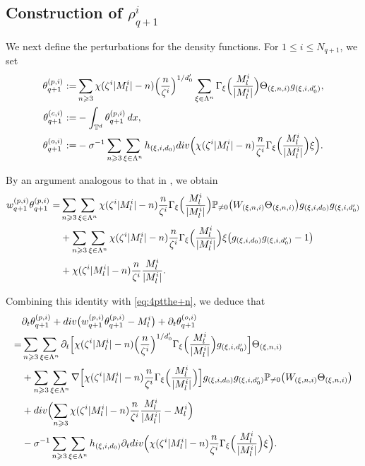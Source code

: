 \documentclass[10pt,a4paper]{amsart}
\numberwithin{equation}{section}
\def\dif{{\mathord{{\rm d}}}}
\def\geq{\geqslant}
\def\leq{\leqslant}
\def\div{\mathord{{\rm div}}}
\def\dif{{\mathord{{\rm d}}}}
\def\geq{\geqslant}
\def\leq{\leqslant}
\def\div{\mathord{{\rm div}}}
\begin{document}
\subsection{Construction of $\rho^{i}_{q+1}$}\label{sec:con:the}
We next define the perturbations for the density functions. 
For $1\leq i\leq N_{q+1}$, we set
\begin{align}
\theta_{q+1}^{(p,i)}
:=
&\sum_{n\geq3}
\chi(\zeta^i|M_l^i|-n)
\Bigl(\frac{n}{\zeta^i}\Bigr)^{1/d_0'}
\sum_{\xi\in\Lambda^n}
\Gamma_\xi\Bigl(\frac{M_l^i}{|M_l^i|}\Bigr)
\Theta_{(\xi,n,i)}
g_{(\xi,i,d_0')},
\notag\\
\theta_{q+1}^{(c,i)}
:=
&-
\int_{\mathbb{T}^d}
\theta_{q+1}^{(p,i)}\,\dif x,
\notag\\
\theta_{q+1}^{(o,i)}
:=
&-
\sigma^{-1}
\sum_{n\geq3}
\sum_{\xi\in\Lambda^n}
h_{(\xi,i,d_0)}
\div\Bigl(
\chi(\zeta^i|M_l^i|-n)
\frac{n}{\zeta^i}
\Gamma_\xi\Bigl(\frac{M_l^i}{|M_l^i|}\Bigr)
\xi
\Bigr).
\notag
\end{align}

By an argument analogous to that in \cite[(5.5)]{LRZ25}, we obtain
\begin{align}
w_{q+1}^{(p,i)}
\theta_{q+1}^{(p,i)}
=
&
\sum_{n\geq3}
\sum_{\xi\in\Lambda^n}
\chi(\zeta^i|M_l^i|-n)
\frac{n}{\zeta^i}
\Gamma_\xi\Bigl(\frac{M_l^i}{|M_l^i|}\Bigr)
\mathbb{P}_{\neq0}
\bigl(
W_{(\xi,n,i)}
\Theta_{(\xi,n,i)}
\bigr)
g_{(\xi,i,d_0)}
g_{(\xi,i,d_0')}
\notag\\
&+
\sum_{n\geq3}
\sum_{\xi\in\Lambda^n}
\chi(\zeta^i|M_l^i|-n)
\frac{n}{\zeta^i}
\Gamma_\xi\Bigl(\frac{M_l^i}{|M_l^i|}\Bigr)
\xi
\bigl(
g_{(\xi,i,d_0)}
g_{(\xi,i,d_0')}
-1
\bigr)
\notag\\
&+
\chi(\zeta^i|M_l^i|-n)
\frac{n}{\zeta^i}
\frac{M_l^i}{|M_l^i|}.
\notag
\end{align}

Combining this identity with \eqref{eq:4ptthe+n}, we deduce that
\begin{align}
&
\partial_t\theta_{q+1}^{(p,i)}
+
\div\bigl(
w_{q+1}^{(p,i)}
\theta_{q+1}^{(p,i)}
-
M_l^i
\bigr)
+
\partial_t\theta_{q+1}^{(o,i)}
\notag\\
=
&
\sum_{n\geq3}
\sum_{\xi\in\Lambda^n}
\partial_t
\Bigl[
\chi(\zeta^i|M_l^i|-n)
\Bigl(\frac{n}{\zeta^i}\Bigr)^{1/d_0'}
\Gamma_\xi\Bigl(\frac{M_l^i}{|M_l^i|}\Bigr)
g_{(\xi,i,d_0')}
\Bigr]
\Theta_{(\xi,n,i)}
\notag\\
&+
\sum_{n\geq3}
\sum_{\xi\in\Lambda^n}
\nabla
\Bigl[
\chi(\zeta^i|M_l^i|-n)
\frac{n}{\zeta^i}
\Gamma_\xi\Bigl(\frac{M_l^i}{|M_l^i|}\Bigr)
\Bigr]
g_{(\xi,i,d_0)}
g_{(\xi,i,d_0')}
\mathbb{P}_{\neq0}
\bigl(
W_{(\xi,n,i)}
\Theta_{(\xi,n,i)}
\bigr)
\notag\\
&+
\div
\Bigl(
\sum_{n\geq3}
\chi(\zeta^i|M_l^i|-n)
\frac{n}{\zeta^i}
\frac{M_l^i}{|M_l^i|}
-
M_l^i
\Bigr)
\notag\\
&-
\sigma^{-1}
\sum_{n\geq3}
\sum_{\xi\in\Lambda^n}
h_{(\xi,i,d_0)}
\partial_t
\div
\Bigl(
\chi(\zeta^i|M_l^i|-n)
\frac{n}{\zeta^i}
\Gamma_\xi\Bigl(\frac{M_l^i}{|M_l^i|}\Bigr)
\xi
\Bigr).
\label{wq+1good}
\end{align}
\end{document}
